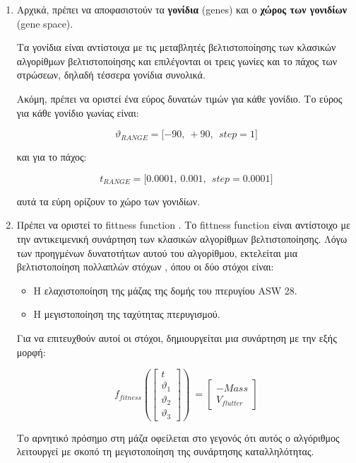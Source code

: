 \begin{enumerate}
\def\labelenumi{\arabic{enumi}.}
\item
  Αρχικά, πρέπει να αποφασιστούν τα \textbf{γονίδια} (\textlatin{genes}) και ο \textbf{χώρος των γονιδίων} \textlatin{(gene space)}.

Τα γονίδια είναι αντίστοιχα με τις μεταβλητές βελτιστοποίησης των κλασικών αλγορίθμων βελτιστοποίησης και επιλέγονται οι τρεις γωνίες και το πάχος των στρώσεων, δηλαδή τέσσερα γονίδια συνολικά.

Ακόμη, πρέπει να οριστεί ένα εύρος δυνατών τιμών για κάθε γονίδιο. Το εύρος για κάθε γονίδιο γωνίας είναι:

\[\vartheta_{RANGE} = \lbrack - 90,\  + 90,\ \ step = 1\rbrack\]

και για το πάχος:

\[t_{RANGE} = \lbrack 0.0001,\ 0.001,\ \ step = 0.0001\rbrack\]

αυτά τα εύρη ορίζουν το χώρο των γονιδίων.

\item
  Πρέπει να οριστεί το \textlatin{fittness function} . Το \textlatin{fittness function}  είναι αντίστοιχο με την αντικειμενική συνάρτηση των κλασικών αλγορίθμων βελτιστοποίησης. Λόγω των προηγμένων δυνατοτήτων αυτού του αλγορίθμου, εκτελείται μια βελτιστοποίηση πολλαπλών στόχων , όπου οι δύο στόχοι είναι:

  \begin{itemize}
  \item
    Η ελαχιστοποίηση της μάζας της δομής του πτερυγίου \textlatin{ASW 28}.
  \item
    Η μεγιστοποίηση της ταχύτητας πτερυγισμού.
  \end{itemize}

Για να επιτευχθούν αυτοί οι στόχοι, δημιουργείται μια συνάρτηση με την εξής μορφή:

\begin{equation}
f_{fitness}\left( \begin{bmatrix}
t \\
\vartheta_{1} \\
\vartheta_{2} \\
\vartheta_{3}
\end{bmatrix} \right)\  = \begin{bmatrix}
 - Mass \\
V_{flutter}
\end{bmatrix}
\end{equation}


Το αρνητικό πρόσημο στη μάζα οφείλεται στο γεγονός ότι αυτός ο αλγόριθμος λειτουργεί με σκοπό τη μεγιστοποίηση της συνάρτησης καταλληλότητας.

\end{enumerate}

